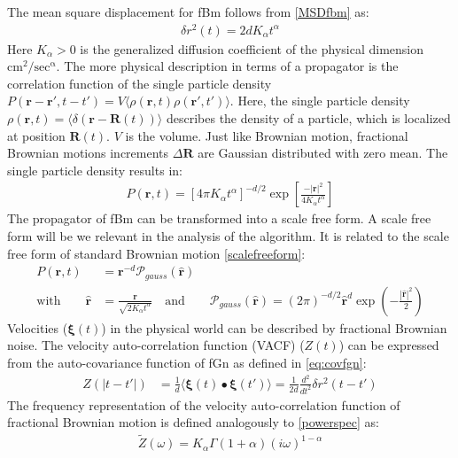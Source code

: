 \documentclass[
  a4paper,BCOR10mm,oneside,
  headsepline,footsepline,%
  fleqn,openbib
]{scrbook}
\begin{document}
The mean square displacement for fBm follows from \cref{MSDfbm} as:
\begin{align}
\delta r^{2}(t)=2dK_{\alpha} t^{\alpha}
\end{align}
Here  $K_{\alpha}>0$  is the generalized diffusion coefficient of the physical dimension $ \mathrm{cm^2/sec^{\alpha}} $. The more physical description in terms of a propagator is the correlation function of the single particle density $P(\bm{r}-\bm{r}',t-t')= V\langle\rho(\bm{r},t) \rho(\bm{r}',t')\rangle$. Here, the single particle density $\rho(\bm{r},t)=\langle \delta(\bm{r}-\bm{R}(t))\rangle$ describes the density of a particle, which is localized at position $\bm{R}(t)$. $V$ is the volume. Just like Brownian motion, fractional Brownian motions increments $\Delta \bm{R}$ are Gaussian distributed with zero mean. The single particle density results in:
\begin{align}
 P(\bm{r},t)=[4 \pi K_{\alpha} t^{\alpha}]^{-d/2} \exp \left[ \frac{-|\bm{r}|^2}{ 4 K_{\alpha} t^{\alpha} }\right]
\end{align}
The propagator of fBm can be transformed into a scale free form. A scale free form will be we relevant in the analysis of the algorithm. It is related to the scale free form of standard Brownian motion \cref{scalefreeform}:
\begin{align}
P(\bm{r},t)&= \bm{r}^{-d} \mathcal{P}_{gauss}(\hat{\bm{r}}) \\ \text{with} \qquad \hat{\bm{r}} &= \frac{\bm{r}}{\sqrt{2 K_{\alpha} t^{\alpha}}}  \quad \text{and} \qquad \mathcal{P}_{gauss}(\bm{\hat{r}})= (2 \pi)^{-d/2}  \bm{\hat{r}}^d \exp \left(- \frac{|\bm{\hat{r}}|^2}{2} \right)\label{scalefreeformfrac}
\end{align}
Velocities ($\bm{\xi}(t)$) in the physical world can be described by fractional Brownian noise. The velocity auto-correlation function (VACF) ($Z(t)$) can be expressed from the auto-covariance function of fGn as defined in \cref{eq:covfgn}:
\begin{align}
Z(|t-t'|)&= \frac{1}{d}\langle \bm{\xi}(t) \bullet \bm{\xi}(t') \rangle = \frac{1}{2d} \frac{d^2}{dt^2} \delta r^2 (t-t')  
\end{align}
The frequency representation of the velocity auto-correlation function of fractional Brownian motion is defined analogously to \cref{powerspec} as:
\begin{align}
  \tilde{Z}(\omega) =  K_{\alpha} \Gamma(1+\alpha)(i \omega)^{1-\alpha}
\end{align}

\end{document}
